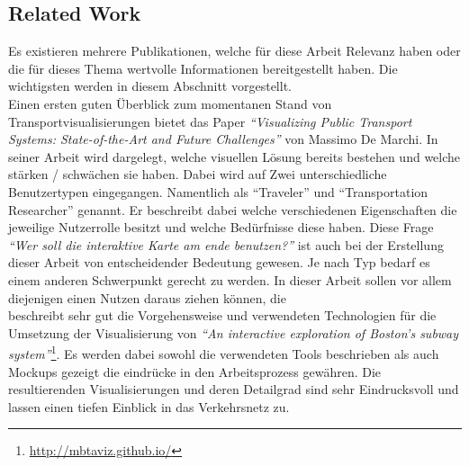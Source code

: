 \begin{newpage}
  \section{Related Work}
  \label{sec:related_work}
    Es existieren mehrere Publikationen, welche für diese Arbeit Relevanz haben oder die für dieses Thema wertvolle Informationen bereitgestellt haben. Die wichtigsten werden in diesem Abschnitt vorgestellt.\\

    Einen ersten guten Überblick zum momentanen Stand von Transportvisualisierungen bietet das Paper \textit{"`Visualizing Public Transport Systems: State-of-the-Art and Future Challenges"'}\parencite{marchi} von Massimo De Marchi. In seiner Arbeit wird dargelegt, welche visuellen Lösung bereits bestehen und welche stärken / schwächen sie haben. Dabei wird auf Zwei unterschiedliche Benutzertypen eingegangen. Namentlich als "`Traveler"' und "`Transportation Researcher"' genannt. Er beschreibt dabei welche verschiedenen Eigenschaften die jeweilige Nutzerrolle besitzt und welche Bedürfnisse diese haben. Diese Frage \textit{"`Wer soll die interaktive Karte am ende benutzen?"'} ist auch bei der Erstellung dieser Arbeit von entscheidender Bedeutung gewesen. Je nach Typ bedarf es einem anderen Schwerpunkt gerecht zu werden. In dieser Arbeit sollen vor allem diejenigen einen Nutzen daraus ziehen können, die\\

    \parencite{mbtaviz} beschreibt sehr gut die Vorgehensweise und verwendeten Technologien für die Umsetzung der Visualisierung von \textit{"`An interactive exploration of Boston's subway system"'}\footnote{\url{http://mbtaviz.github.io/}}. Es werden dabei sowohl die verwendeten Tools beschrieben als auch Mockups gezeigt die eindrücke in den Arbeitsprozess gewähren. Die resultierenden Visualisierungen und deren Detailgrad sind sehr Eindrucksvoll und lassen einen tiefen Einblick in das Verkehrsnetz zu.\\


\end{newpage}
